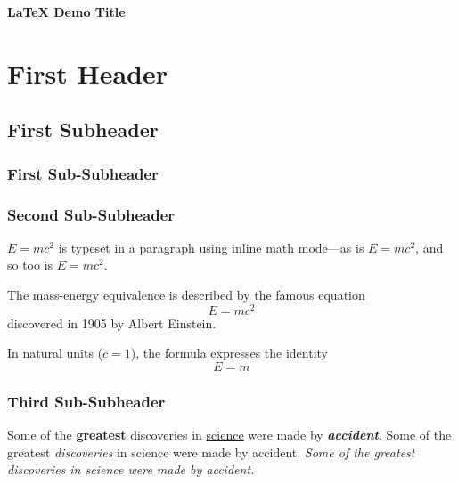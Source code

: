 \documentclass[12pt]{article}
\def\Title{\LaTeX{} Demo Title}
\begin{document}
\thispagestyle{fancy} %


\vspace{1em}
{\raggedright
\textbf{\fontsize{18}{21}\selectfont \Title}\\
\par}

\section{First Header}
\lipsum[1-2]

\subsection{First Subheader}
\lipsum[3-4]

\subsubsection{First Sub-Subheader}
\lipsum[5-6]

\subsubsection{Second Sub-Subheader}
\lipsum[5-6]

\begin{math}
E=mc^2
\end{math} is typeset in a paragraph using inline math mode---as is $E=mc^2$, and so too is \(E=mc^2\).

The mass-energy equivalence is described by the famous equation
\[ E=mc^2 \] discovered in 1905 by Albert Einstein. 

In natural units ($c = 1$), the formula expresses the identity
\begin{equation}
E=m
\end{equation}

\newpage %

\subsubsection{Third Sub-Subheader}
\lipsum[5-6]

Some of the \textbf{greatest}
discoveries in \underline{science} 
were made by \textbf{\textit{accident}}.
Some of the greatest \emph{discoveries} in science 
were made by accident.
\textit{Some of the greatest \emph{discoveries} 
in science were made by accident.}
\end{document}
